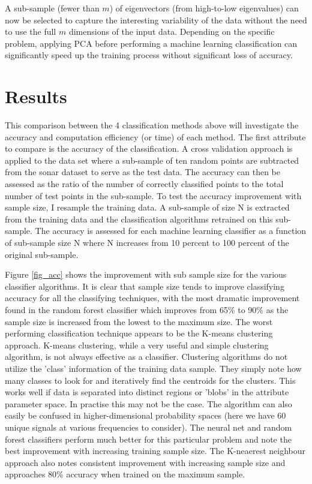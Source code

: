 \documentclass[10pt]{article}
\begin{document}
A sub-sample (fewer than $m$) of eigenvectors (from high-to-low eigenvalues)  can now be selected to capture the interesting variability of the data without the need to use the full $m$ dimensions of the input data. Depending on the specific problem, applying PCA before performing a machine learning classification can significantly speed up the training process without significant loss of accuracy. 





\section{Results}

This comparison between the 4 classification methods above will investigate the accuracy and computation efficiency (or time) of each method. The first attribute to compare is the accuracy of the classification. A cross validation approach is applied to the data set where a sub-sample of ten random points are subtracted from the sonar dataset to serve as the test data. The accuracy can then be assessed as the ratio of the number of correctly classified points to the total number of test points in the sub-sample. To test the accuracy improvement with sample size, I resample the training data. A sub-sample of size N is extracted from the training data and the classification algorithms retrained on this sub-sample. The accuracy is assessed for each machine learning classifier as a function of sub-sample size N where N increases from 10 percent to 100 percent of the original sub-sample. 

Figure \ref{fig_acc} shows the improvement with sub sample size for the various classifier algorithms. It is clear that sample size tends to improve classifying accuracy for all the classifying techniques, with the most dramatic improvement found in the random forest classifier which improves from 65\% to 90\% as the sample size is increased from the lowest to the maximum size. The worst performing classification technique appears to be the K-means clustering approach. K-means clustering, while a very useful and simple clustering algorithm, is not always effective as a classifier. Clustering algorithms do not utilize the 'class' information of the training data sample. They simply note how many classes to look for and iteratively find the centroids for the clusters. This works well if data is separated into distinct regions or 'blobs' in the attribute parameter space. In practise this may not be the case. The algorithm can also easily be confused in higher-dimensional probability spaces (here we have 60 unique signals at various frequencies to consider). The neural net and random forest classifiers perform much better for this particular problem and note the best improvement with increasing training sample size. The K-neaerest neighbour approach also notes consistent improvement with increasing sample size and approaches 80\% accuracy when trained on the maximum sample. 
\end{document}
